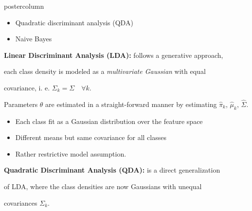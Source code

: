\documentclass{beamer}
\begin{document}
\begin{frame}[fragile]{}
\begin{columns}
\begin{column}{.31\textwidth}
\begin{beamercolorbox}[center]{postercolumn}
\begin{minipage}{.98\textwidth}
{\begin{myblock}{}
  \begin{itemize}[$\bullet$]    
  \setlength{\itemindent}{+.3in}
    \item Quadratic discriminant analysis (QDA)
    \item Naive Bayes
  \end{itemize}
  
  \vspace*{1ex}
  
  \begin{codebox}
  \textbf{Linear Discriminant Analysis (LDA): }follows a generative approach,
  \end{codebox}
  
  \begin{codebox}
  each class density is modeled as a \emph{multivariate Gaussian} with equal
  \end{codebox}
  
  \begin{codebox}
  covariance, i. e. $\Sigma_k = \Sigma \quad \forall k$.
  \end{codebox}
  
  \hspace*{1ex}Parameters $\theta$ are estimated in a straight-forward manner by estimating \hspace*{1ex}$\hat{\pi}_k$, $\hat{\mu}_k$, $\hat{\Sigma}$.
  
  \begin{itemize}[$\bullet$]     
  \setlength{\itemindent}{+.3in}
      \item Each class fit as a Gaussian distribution over the feature space
      \item Different means but same covariance for all classes
      \item Rather restrictive model assumption.
  \end{itemize}

  \vspace*{1ex}

  \begin{codebox}
  \textbf{Quadratic Discriminant Analysis (QDA): }is a direct generalization
  \end{codebox}
  
  \begin{codebox}
  of LDA, where the class densities are now Gaussians with unequal 
  \end{codebox}
  
  \begin{codebox}
  covariances $\Sigma_k$.
  \end{codebox}
  

\end{myblock}}
\end{minipage}
\end{beamercolorbox}
\end{column}
\end{columns}
\end{frame}
\end{document}
